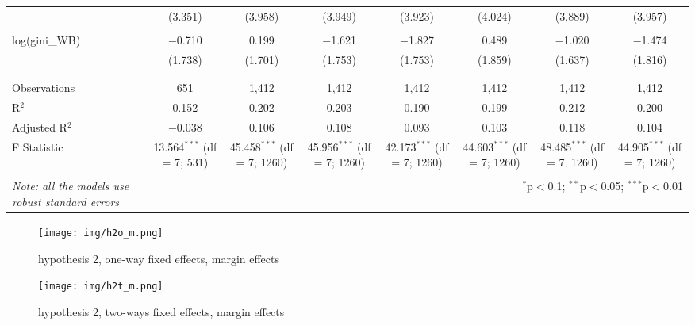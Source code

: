 \documentclass[a4paper, 12pt]{article}
\begin{document}
\begin{table}[!htbp]
{\begin{tabular}{@{\extracolsep{5pt}}lccccccc}
  & (3.351) & (3.958) & (3.949) & (3.923) & (4.024) & (3.889) & (3.957) \\ 
  & & & & & & & \\ 
 log(gini\_WB) & $-$0.710 & 0.199 & $-$1.621 & $-$1.827 & 0.489 & $-$1.020 & $-$1.474 \\ 
  & (1.738) & (1.701) & (1.753) & (1.753) & (1.859) & (1.637) & (1.816) \\ 
  & & & & & & & \\ 
\hline \\[-1.8ex] 
Observations & 651 & 1,412 & 1,412 & 1,412 & 1,412 & 1,412 & 1,412 \\ 
R$^{2}$ & 0.152 & 0.202 & 0.203 & 0.190 & 0.199 & 0.212 & 0.200 \\ 
Adjusted R$^{2}$ & $-$0.038 & 0.106 & 0.108 & 0.093 & 0.103 & 0.118 & 0.104 \\ 
F Statistic & 13.564$^{***}$ (df = 7; 531) & 45.458$^{***}$ (df = 7; 1260) & 45.956$^{***}$ (df = 7; 1260) & 42.173$^{***}$ (df = 7; 1260) & 44.603$^{***}$ (df = 7; 1260) & 48.485$^{***}$ (df = 7; 1260) & 44.905$^{***}$ (df = 7; 1260) \\ 
\hline 
\hline \\[-1.8ex] 
\textit{Note: all the models use robust standard errors}  & \multicolumn{7}{r}{$^{*}$p$<$0.1; $^{**}$p$<$0.05; $^{***}$p$<$0.01} \\ 
\end{tabular} 
}
\end{table} 

\begin{figure}[h!]
    \centering
    \texttt{[image: img/h2o\_m.png]}
    \caption{hypothesis 2, one-way fixed effects, margin effects}
    \label{h2o_m}
\end{figure}

\begin{figure}[h!]
    \centering
    \texttt{[image: img/h2t\_m.png]}
    \caption{hypothesis 2, two-ways fixed effects, margin effects}
    \label{h2t_m}
\end{figure}
\end{document}
